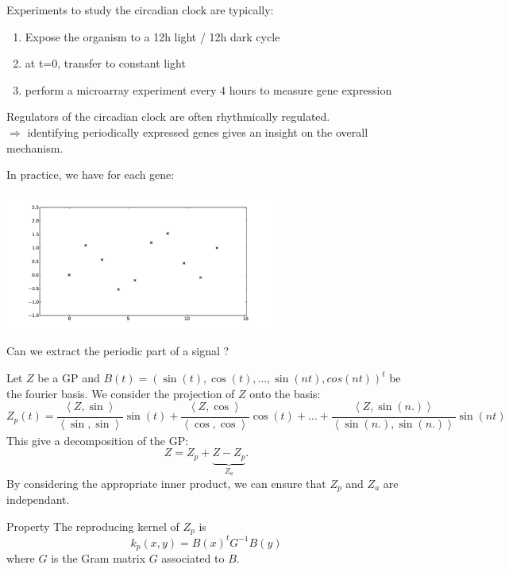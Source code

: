 \documentclass{beamer}
\newcommand\PSi[2]{{ \left \langle #1 \right \rangle}_{\! #2}}
\begin{document}
\begin{frame}{}
Experiments to study the circadian clock are typically:
\begin{enumerate}
 \item Expose the organism to a 12h light / 12h dark cycle
 \item at t=0, transfer to constant light
 \item perform a microarray experiment every 4 hours to measure gene expression
\end{enumerate}
 
\begin{block}{}
Regulators of the circadian clock are often rhythmically regulated.\\
\qquad \alert{$\Rightarrow$ identifying periodically expressed genes gives an insight on the overall mechanism.}
\end{block}
\end{frame}

\begin{frame}{}
\begin{block}{}
In practice, we have for each gene:
\vspace{.3cm}
\begin{center}
 \includegraphics[height=4.5cm]{figures/Fig2-f}
\end{center}
\vspace{.3cm}
\end{block}
 Can we extract the periodic part of a signal ?\\
\end{frame}

\begin{frame}{}
Let $Z$ be a GP and $B(t) = ( \sin(t), \cos(t), \dots, \sin(nt), cos(nt))^t$ be the fourier basis. We consider the projection of $Z$ onto the basis:
\small
$$Z_p(t) = \frac{ \PSi{Z,\sin}{} }{ \PSi{\sin,\sin}{} } \sin(t) +
\frac{ \PSi{Z,\cos}{} }{ \PSi{\cos,\cos}{} } \cos(t) +
\dots + 
\frac{ \PSi{Z,\sin(n.)}{} }{ \PSi{\sin(n.),\sin(n.)}{} } \sin(nt) $$
\normalsize
 This give a decomposition of the GP:
$$Z = Z_p + \underbrace{Z - Z_p}_{Z_a}.$$
By considering the appropriate inner product, we can ensure that $Z_p$ and $Z_a$ are independant. 
\vspace{0.5cm}
\begin{block}{Property}
 The reproducing kernel of $Z_p$ is 
 \begin{equation*}
  k_p(x,y) = B(x)^t G^{-1} B(y)
 \end{equation*}
 where $G$ is the Gram matrix $G$ associated to $B$.
\end{block}
\end{frame}
\end{document}
